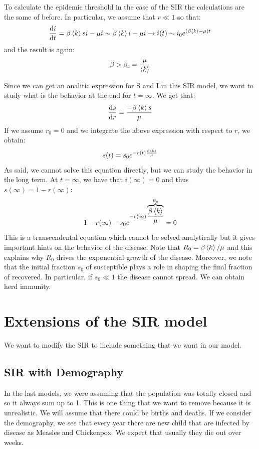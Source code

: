 \documentclass[../main/main.tex]{subfiles}
\begin{document}
To calculate the epidemic threshold in the case of the SIR the calculations are the same of before. In particular, we assume that \( r \ll 1 \) so that:
\begin{equation*}
  \dv{i}{t} = \beta \expval{k} s i - \mu i \sim \beta \expval{k} i - \mu i \rightarrow i(t) \sim i_0 e^{(\beta \expval{k} - \mu  )t}
\end{equation*}
and the result is again:
\begin{equation}
  \beta > \beta _c = \frac{\mu }{\expval{k} }
\end{equation}

Since we can get an analitic expression for S and I in this SIR model, we want to study what is the behavior at the end for \( t = \infty  \). We get that:
\begin{equation*}
  \dv{s}{r} = \frac{- \beta  \expval{k}  s}{\mu }
\end{equation*}
If we assume \( r_0 = 0  \) and we integrate the above expression with respect to \( r \), we obtain:
\begin{equation*}
  s(t) = s_0 e^{-r(t) \frac{\beta \expval{k} }{\mu }}
\end{equation*}
As said, we cannot solve this equation directly, but we can study the behavior in the long term. At \( t=\infty  \), we have that \( i (\infty ) = 0 \) and thus \( s(\infty ) = 1 - r(\infty ) \):
\begin{equation*}
  1 - r(\infty ) - s_0 e^{-r(\infty ) \overbrace{\frac{\beta \expval{k} }{\mu }}^{R_0}} = 0
\end{equation*}
This is a transcendental equation which cannot be solved analytically but it gives important hints on the behavior of the disease.
Note that \( R_0 = \beta \expval{k} / \mu   \) and this explains why \( R_0 \) drives the exponential growth of the disease. Moreover, we note that the initial fraction \( s_0 \) of susceptible plays a role in shaping the final fraction of recovered.
In particular, if \( s_0 \ll 1 \) the disease cannot spread. We can obtain herd immunity.




\section{Extensions of the SIR model}
We want to modify the SIR to include something that we want in our model.

\subsection{SIR with Demography}
In the last models, we were assuming that the population was totally closed and so it always sum up to 1. This is one thing that we want to remove because it is unrealistic. We will assume that there could be births and deaths.
If we consider the demography, we see that every year there are new child that are infected by disease as Measles and Chickenpox. We expect that usually they die out over weeks.
\end{document}

